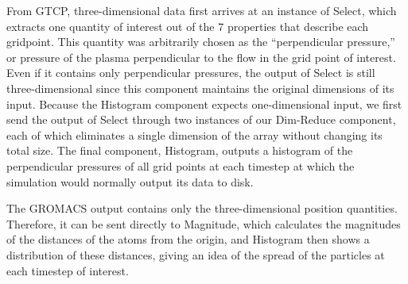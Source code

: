 From GTCP, three-dimensional data first
arrives at an instance of Select, which extracts
one quantity of interest out of the 7 properties that describe each gridpoint.
This quantity was arbitrarily chosen as the ``perpendicular
pressure,'' or pressure of the plasma perpendicular to the flow in the grid
point of interest. Even if it contains only perpendicular pressures, the output
of Select is still three-dimensional since this component maintains the
original dimensions of its input. Because the Histogram component expects
one-dimensional input, we first send the output of Select through two instances
of our Dim-Reduce component, each of which eliminates a single dimension of the
array without changing its total size. The final component, Histogram, outputs
a histogram of the perpendicular pressures of all grid points at each timestep
at which the simulation would normally output its data to disk.

The GROMACS output
contains only the three-dimensional
position quantities.
Therefore, it can be sent directly to
Magnitude, which calculates
the magnitudes of the distances of the atoms from
the origin, and Histogram then shows a distribution
of these distances, giving an idea of the spread
of the particles at each timestep of interest.
